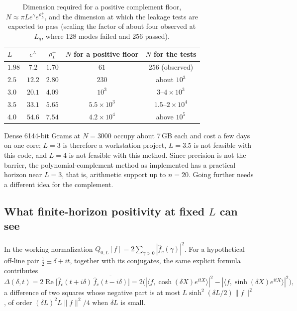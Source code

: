 \documentclass[11pt]{article}
\numberwithin{equation}{section}
\theoremstyle{definition}
\theoremstyle{remark}
\newcommand{\Rea}{\operatorname{Re}}
\newcommand{\norm}[1]{\lVert#1\rVert}
\newcommand{\ip}[2]{\langle#1,#2\rangle}
\newcommand{\Lq}{L_q}
\begin{document}
\begin{table}[t]\centering\small
\caption{Dimension required for a positive complement floor, $N\approx\pi Le^{\gamma}e^{\rho^+_L}$, and the dimension at which the leakage tests are expected to pass (scaling the factor of about four observed at $\Lq$, where 128 modes failed and 256 passed).}\label{tab:dimension}
\begin{tabular}{@{}lcccc@{}}\toprule
$L$ & $e^L$ & $\rho^+_L$ & $N$ for a positive floor & $N$ for the tests\\\midrule
$1.98$ & $7.2$ & $1.70$ & $61$ & $256$ (observed)\\
$2.5$ & $12.2$ & $2.80$ & $230$ & about $10^3$\\
$3.0$ & $20.1$ & $4.09$ & $10^3$ & $3$--$4\times10^3$\\
$3.5$ & $33.1$ & $5.65$ & $5.5\times10^3$ & $1.5$--$2\times10^4$\\
$4.0$ & $54.6$ & $7.54$ & $4.2\times10^4$ & above $10^5$\\\bottomrule
\end{tabular}
\end{table}

Dense 6144-bit Grams at $N=3000$ occupy about 7\,GB each and cost a few days on one core; $L=3$ is therefore a workstation project, $L=3.5$ is not feasible with this code, and $L=4$ is not feasible with this method. Since precision is not the barrier, the polynomial-complement method as implemented has a practical horizon near $L=3$, that is, arithmetic support up to $n=20$. Going further needs a different idea for the complement.

\subsection{What finite-horizon positivity at fixed \texorpdfstring{$L$}{L} can see}\label{sec:zeros}
In the working normalization $Q_{0,L}[f]=2\sum_{\gamma>0}|\widehat f_c(\gamma)|^2$. For a hypothetical off-line pair $\tfrac12\pm\delta+it$, together with its conjugates, the same explicit formula contributes
\[
 \Delta(\delta,t)=2\Rea\bigl[\widehat f_c(t+i\delta)\,\overline{\widehat f_c(t-i\delta)}\bigr]
 =2\bigl(|\ip f{\cosh(\delta X)e^{itX}}|^2-|\ip f{\sinh(\delta X)e^{itX}}|^2\bigr),
\]
a difference of two squares whose negative part is at most $L\sinh^2(\delta L/2)\norm f^2$, of order $(\delta L)^2L\norm f^2/4$ when $\delta L$ is small.
\end{document}
